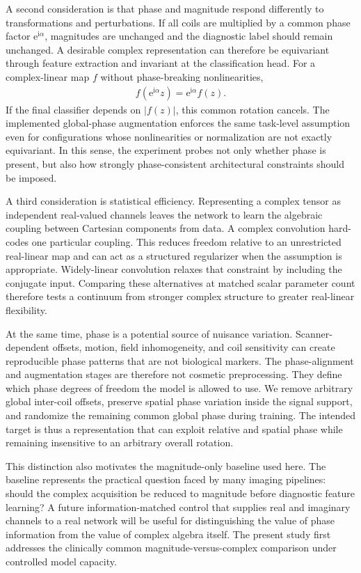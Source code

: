 \documentclass[journal]{IEEEtran}
\begin{document}
A second consideration is that phase and magnitude respond differently to transformations and perturbations. If all coils are multiplied by a common phase factor $\mathrm{e}^{\mathrm{i}\alpha}$, magnitudes are unchanged and the diagnostic label should remain unchanged. A desirable complex representation can therefore be equivariant through feature extraction and invariant at the classification head. For a complex-linear map $f$ without phase-breaking nonlinearities,
\begin{align}
f(\mathrm{e}^{\mathrm{i}\alpha}z)
=\mathrm{e}^{\mathrm{i}\alpha}f(z).
\end{align}
If the final classifier depends on $|f(z)|$, this common rotation cancels. The implemented global-phase augmentation enforces the same task-level assumption even for configurations whose nonlinearities or normalization are not exactly equivariant. In this sense, the experiment probes not only whether phase is present, but also how strongly phase-consistent architectural constraints should be imposed.

A third consideration is statistical efficiency. Representing a complex tensor as independent real-valued channels leaves the network to learn the algebraic coupling between Cartesian components from data. A complex convolution hard-codes one particular coupling. This reduces freedom relative to an unrestricted real-linear map and can act as a structured regularizer when the assumption is appropriate. Widely-linear convolution relaxes that constraint by including the conjugate input. Comparing these alternatives at matched scalar parameter count therefore tests a continuum from stronger complex structure to greater real-linear flexibility.

At the same time, phase is a potential source of nuisance variation. Scanner-dependent offsets, motion, field inhomogeneity, and coil sensitivity can create reproducible phase patterns that are not biological markers. The phase-alignment and augmentation stages are therefore not cosmetic preprocessing. They define which phase degrees of freedom the model is allowed to use. We remove arbitrary global inter-coil offsets, preserve spatial phase variation inside the signal support, and randomize the remaining common global phase during training. The intended target is thus a representation that can exploit relative and spatial phase while remaining insensitive to an arbitrary overall rotation.

This distinction also motivates the magnitude-only baseline used here. The baseline represents the practical question faced by many imaging pipelines: should the complex acquisition be reduced to magnitude before diagnostic feature learning? A future information-matched control that supplies real and imaginary channels to a real network will be useful for distinguishing the value of phase information from the value of complex algebra itself. The present study first addresses the clinically common magnitude-versus-complex comparison under controlled model capacity.
\end{document}
